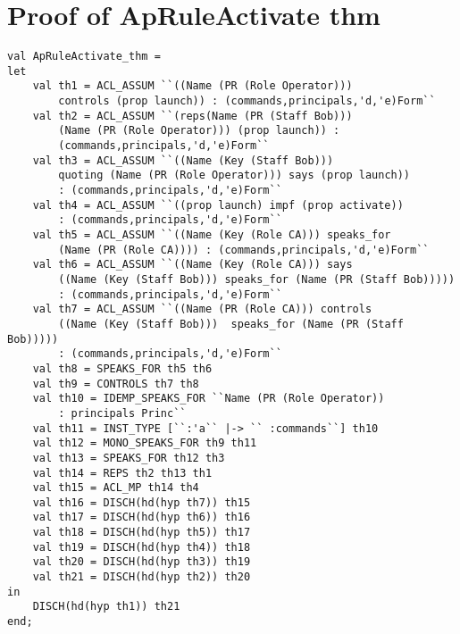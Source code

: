 \documentclass{report}
\begin{document}
\section{Proof of ApRuleActivate thm}
\label{proof-14-4-1-C}
\begin{lstlisting}[frame=TBlr]
val ApRuleActivate_thm =
let
	val th1 = ACL_ASSUM ``((Name (PR (Role Operator))) 
        controls (prop launch)) : (commands,principals,'d,'e)Form``
	val th2 = ACL_ASSUM ``(reps(Name (PR (Staff Bob))) 
        (Name (PR (Role Operator))) (prop launch)) : 
        (commands,principals,'d,'e)Form``
 	val th3 = ACL_ASSUM ``((Name (Key (Staff Bob))) 
        quoting (Name (PR (Role Operator))) says (prop launch)) 
        : (commands,principals,'d,'e)Form``
 	val th4 = ACL_ASSUM ``((prop launch) impf (prop activate)) 
        : (commands,principals,'d,'e)Form``
	val th5 = ACL_ASSUM ``((Name (Key (Role CA))) speaks_for 
        (Name (PR (Role CA)))) : (commands,principals,'d,'e)Form``
	val th6 = ACL_ASSUM ``((Name (Key (Role CA))) says 
        ((Name (Key (Staff Bob))) speaks_for (Name (PR (Staff Bob))))) 
        : (commands,principals,'d,'e)Form``
	val th7 = ACL_ASSUM ``((Name (PR (Role CA))) controls 
        ((Name (Key (Staff Bob)))  speaks_for (Name (PR (Staff Bob))))) 
        : (commands,principals,'d,'e)Form``
	val th8 = SPEAKS_FOR th5 th6
 	val th9 = CONTROLS th7 th8
 	val th10 = IDEMP_SPEAKS_FOR ``Name (PR (Role Operator)) 
        : principals Princ``
 	val th11 = INST_TYPE [``:'a`` |-> `` :commands``] th10
 	val th12 = MONO_SPEAKS_FOR th9 th11
 	val th13 = SPEAKS_FOR th12 th3
 	val th14 = REPS th2 th13 th1
 	val th15 = ACL_MP th14 th4
 	val th16 = DISCH(hd(hyp th7)) th15
 	val th17 = DISCH(hd(hyp th6)) th16
 	val th18 = DISCH(hd(hyp th5)) th17
 	val th19 = DISCH(hd(hyp th4)) th18
 	val th20 = DISCH(hd(hyp th3)) th19
 	val th21 = DISCH(hd(hyp th2)) th20
in
	DISCH(hd(hyp th1)) th21
end;
\end{lstlisting}
\end{document}
